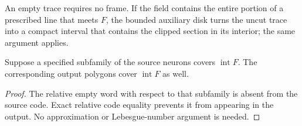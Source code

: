 \begin{remark}
An empty trace requires no frame.  If the field contains the entire portion
of a prescribed line that meets $F$, the bounded auxiliary disk turns the
uncut trace into a compact interval that contains the clipped section in its
interior; the same argument applies.
\end{remark}

\begin{corollary}\label{cor:covered}
Suppose a specified subfamily of the source neurons covers
$\operatorname{int}F$.  The corresponding output polygons cover
$\operatorname{int}F$ as well.
\end{corollary}

\begin{proof}
The relative empty word with respect to that subfamily is absent from the
source code.  Exact relative code equality prevents it from appearing in the
output.  No approximation or Lebesgue-number argument is needed.
\end{proof}
